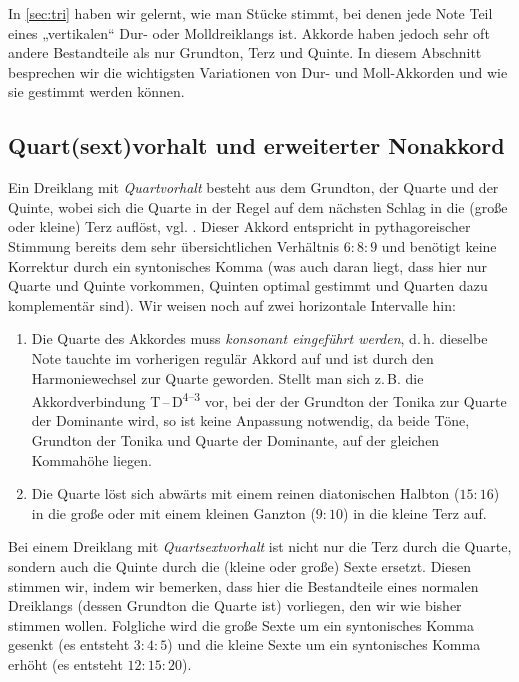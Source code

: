 In \cref{sec:tri} haben wir gelernt, wie man Stücke stimmt, bei denen jede Note
Teil eines „vertikalen“ Dur- oder Molldreiklangs ist. Akkorde haben jedoch sehr
oft andere Bestandteile als nur Grundton, Terz und Quinte. In diesem Abschnitt
besprechen wir die wichtigsten Variationen von Dur- und Moll-Akkorden und wie
sie gestimmt werden können.

\subsection{Quart(sext)vorhalt und erweiterter Nonakkord}
\label{sec:49}

Ein Dreiklang mit \emph{Quartvorhalt} besteht aus dem Grundton, der Quarte und
der Quinte, wobei sich die Quarte in der Regel auf dem nächsten Schlag in die
(große oder kleine) Terz auflöst, vgl. \cite[{}8.2]{Skript}. Dieser Akkord
entspricht in pythagoreischer Stimmung bereits dem sehr übersichtlichen
Verhältnis $6:8:9$ und benötigt keine Korrektur durch ein syntonisches Komma
(was auch daran liegt, dass hier nur Quarte und Quinte vorkommen, Quinten
optimal gestimmt und Quarten dazu komplementär sind).  Wir weisen noch auf zwei
horizontale Intervalle hin:
\begin{enumerate}
\item Die Quarte des Akkordes muss \emph{konsonant eingeführt werden},
  d.\,h. dieselbe Note tauchte im vorherigen regulär Akkord auf und ist durch
  den Harmoniewechsel zur Quarte geworden. Stellt man sich z.\,B. die
  Akkordverbindung T\,–\,D\textsuperscript{$4$–$3$} vor, bei der der Grundton
  der Tonika zur Quarte der Dominante wird, so ist keine Anpassung notwendig, da
  beide Töne, Grundton der Tonika und Quarte der Dominante, auf der gleichen
  Kommahöhe liegen.
\item Die Quarte löst sich abwärts mit einem reinen diatonischen Halbton
  ($15:16$) in die große oder mit einem kleinen Ganzton ($9:10$) in die
  kleine Terz auf.
\end{enumerate}
Bei einem Dreiklang mit \emph{Quartsextvorhalt} ist nicht nur die Terz durch die
Quarte, sondern auch die Quinte durch die (kleine oder große) Sexte ersetzt.
Diesen stimmen wir, indem wir bemerken, dass hier die Bestandteile eines
normalen Dreiklangs (dessen Grundton die Quarte ist) vorliegen, den wir wie
bisher stimmen wollen. Folgliche wird die große Sexte um ein syntonisches Komma
gesenkt (es entsteht $3:4:5$) und die kleine Sexte um ein syntonisches Komma
erhöht (es entsteht $12:15:20$).

